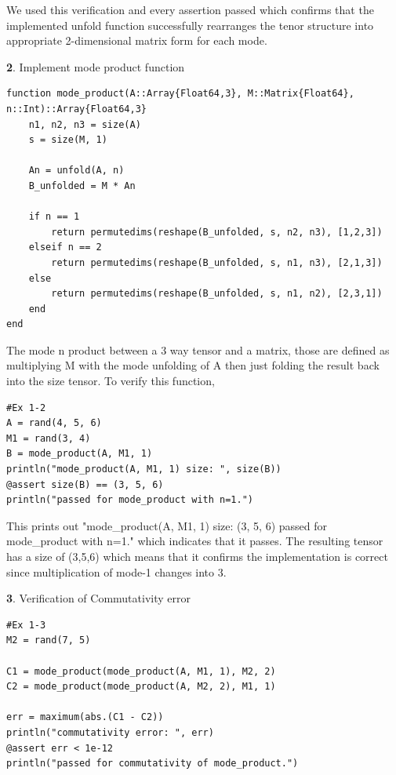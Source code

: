 \documentclass[11pt]{article}
\begin{document}
We used this verification and every assertion passed which confirms that the implemented unfold function successfully rearranges the tenor structure into appropriate 2-dimensional matrix form for each mode.

\vspace{1.5em}

\textbf{2}. Implement mode product function

\begin{lstlisting}
function mode_product(A::Array{Float64,3}, M::Matrix{Float64}, n::Int)::Array{Float64,3}
    n1, n2, n3 = size(A)
    s = size(M, 1)
    
    An = unfold(A, n)
    B_unfolded = M * An
    
    if n == 1
        return permutedims(reshape(B_unfolded, s, n2, n3), [1,2,3])
    elseif n == 2
        return permutedims(reshape(B_unfolded, s, n1, n3), [2,1,3])
    else
        return permutedims(reshape(B_unfolded, s, n1, n2), [2,3,1])
    end
end
\end{lstlisting}

The mode n product between a 3 way tensor and a matrix, those are defined as multiplying M with the mode unfolding of A then just folding the result back into the size tensor.
To verify this function,

\begin{lstlisting}
#Ex 1-2
A = rand(4, 5, 6)
M1 = rand(3, 4)
B = mode_product(A, M1, 1)
println("mode_product(A, M1, 1) size: ", size(B))
@assert size(B) == (3, 5, 6)
println("passed for mode_product with n=1.")
\end{lstlisting}

This prints out
"mode\_product(A, M1, 1) size: (3, 5, 6)
passed for mode\_product with n=1." which indicates that it passes. The resulting tensor has a size of (3,5,6) which means that it confirms the implementation is correct since multiplication of mode-1 changes into 3. 


\vspace{1.5em}

\textbf{3}. Verification of Commutativity error

\begin{lstlisting}
#Ex 1-3
M2 = rand(7, 5)

C1 = mode_product(mode_product(A, M1, 1), M2, 2)
C2 = mode_product(mode_product(A, M2, 2), M1, 1)

err = maximum(abs.(C1 - C2))
println("commutativity error: ", err)
@assert err < 1e-12
println("passed for commutativity of mode_product.")
\end{lstlisting}
\end{document}
